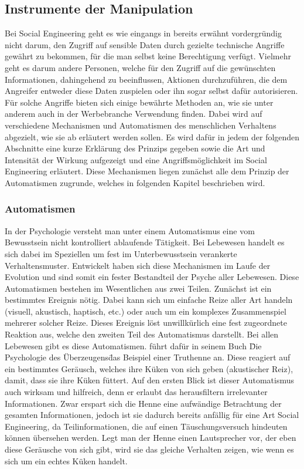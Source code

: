 \subsection{Instrumente der Manipulation}\label{sec:instrumente_der_manipulation}

Bei Social Engineering geht es wie eingangs in  bereits erwähnt vordergründig
nicht darum, den Zugriff auf sensible Daten durch gezielte technische Angriffe gewährt zu bekommen,
für die man selbst keine Berechtigung verfügt.
Vielmehr geht es darum andere Personen, welche für den Zugriff auf die gewünschten Informationen, dahingehend
zu beeinflussen, Aktionen durchzuführen, die dem Angreifer entweder diese Daten zuspielen oder ihn sogar selbst dafür autorisieren.
Für solche Angriffe bieten sich einige bewährte Methoden an, wie sie unter anderem auch in der Werbebranche
Verwendung finden.
Dabei wird auf verschiedene Mechanismen und Automatismen des menschlichen Verhaltens abgezielt, wie sie ab  erläutert werden sollen.
Es wird dafür in jedem der folgenden Abschnitte eine kurze Erklärung des Prinzips gegeben sowie die Art und
Intensität der Wirkung aufgezeigt und eine Angriffsmöglichkeit im Social Engineering erläutert.
Diese Mechanismen liegen zunächst alle dem Prinzip der Automatismen zugrunde, welches in folgenden Kapitel beschrieben wird.

\subsubsection{Automatismen}\label{sec:automatismen}
In der Psychologie versteht man unter einem Automatismus eine vom Bewusstsein nicht kontrolliert ablaufende Tätigkeit. \citep{duden}
Bei Lebewesen handelt es sich dabei im Speziellen um fest im Unterbewusstsein verankerte Verhaltensmuster.
Entwickelt haben sich diese Mechanismen im Laufe der Evolution und sind somit ein fester Bestandteil der Psyche aller Lebewesen.
Diese Automatismen bestehen im Wesentlichen aus zwei Teilen. Zunächst ist ein bestimmtes Ereignis nötig. Dabei kann sich um einfache Reize aller Art handeln (visuell, akustisch, haptisch, etc.) oder auch um ein
komplexes Zusammenspiel mehrerer solcher Reize.
Dieses Ereignis löst unwillkürlich eine fest zugeordnete Reaktion aus, welche den zweiten Teil des Automatismus darstellt.
Bei allen Lebewesen gibt es diese Automatismen.  führt dafür in seinem Buch \"Die Psychologie des Überzeugens\" das Beispiel einer Truthenne an. Diese reagiert auf ein bestimmtes Geräusch, welches ihre Küken von sich geben (akustischer Reiz), damit, dass sie ihre Küken füttert.
Auf den ersten Blick ist dieser Automatismus auch wirksam und hilfreich, denn er erlaubt das herausfiltern irrelevanter Informationen.
Zwar erspart sich die Henne eine aufwändige Betrachtung der gesamten Informationen, jedoch ist sie dadurch bereits anfällig für eine Art Social Engineering, da Teilinformationen, die auf einen Täuschungsversuch hindeuten können übersehen werden.
Legt man der Henne einen Lautsprecher vor, der eben diese Geräusche von sich gibt, wird sie das gleiche Verhalten zeigen, wie wenn es sich um ein echtes Küken handelt.

